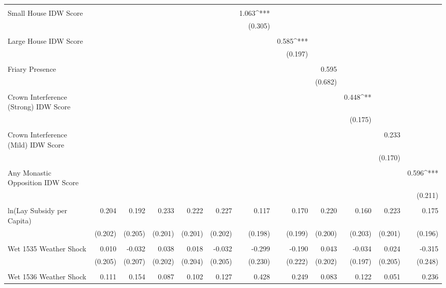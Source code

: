 \begin{table}[H]
\begin{tabular}{@{\extracolsep{.5pt}}lD{.}{.}{-3} D{.}{.}{-3} D{.}{.}{-3} D{.}{.}{-3} D{.}{.}{-3} D{.}{.}{-3} D{.}{.}{-3} D{.}{.}{-3} D{.}{.}{-3} D{.}{.}{-3} D{.}{.}{-3} }
  & & & & & & & & & & & \\ 
 Small House IDW Score &  &  &  &  &  & 1.063^{***} &  &  &  &  &  \\ 
  &  &  &  &  &  & (0.305) &  &  &  &  &  \\ 
  & & & & & & & & & & & \\ 
 Large House IDW Score &  &  &  &  &  &  & 0.585^{***} &  &  &  &  \\ 
  &  &  &  &  &  &  & (0.197) &  &  &  &  \\ 
  & & & & & & & & & & & \\ 
 Friary Presence &  &  &  &  &  &  &  & 0.595 &  &  &  \\ 
  &  &  &  &  &  &  &  & (0.682) &  &  &  \\ 
  & & & & & & & & & & & \\ 
 Crown Interference (Strong) IDW Score &  &  &  &  &  &  &  &  & 0.448^{**} &  &  \\ 
  &  &  &  &  &  &  &  &  & (0.175) &  &  \\ 
  & & & & & & & & & & & \\ 
 Crown Interference (Mild) IDW Score &  &  &  &  &  &  &  &  &  & 0.233 &  \\ 
  &  &  &  &  &  &  &  &  &  & (0.170) &  \\ 
  & & & & & & & & & & & \\ 
 Any Monastic Opposition IDW Score &  &  &  &  &  &  &  &  &  &  & 0.596^{***} \\ 
  &  &  &  &  &  &  &  &  &  &  & (0.211) \\ 
  & & & & & & & & & & & \\ 
 ln(Lay Subsidy per Capita) & 0.204 & 0.192 & 0.233 & 0.222 & 0.227 & 0.117 & 0.170 & 0.220 & 0.160 & 0.223 & 0.175 \\ 
  & (0.202) & (0.205) & (0.201) & (0.201) & (0.202) & (0.198) & (0.199) & (0.200) & (0.203) & (0.201) & (0.196) \\ 
  & & & & & & & & & & & \\ 
 Wet 1535 Weather Shock & 0.010 & -0.032 & 0.038 & 0.018 & -0.032 & -0.299 & -0.190 & 0.043 & -0.034 & 0.024 & -0.315 \\ 
  & (0.205) & (0.207) & (0.202) & (0.204) & (0.205) & (0.230) & (0.222) & (0.202) & (0.197) & (0.205) & (0.248) \\ 
  & & & & & & & & & & & \\ 
 Wet 1536 Weather Shock & 0.111 & 0.154 & 0.087 & 0.102 & 0.127 & 0.428 & 0.249 & 0.083 & 0.122 & 0.051 & 0.236 \\ 

\end{tabular}
\end{table}
